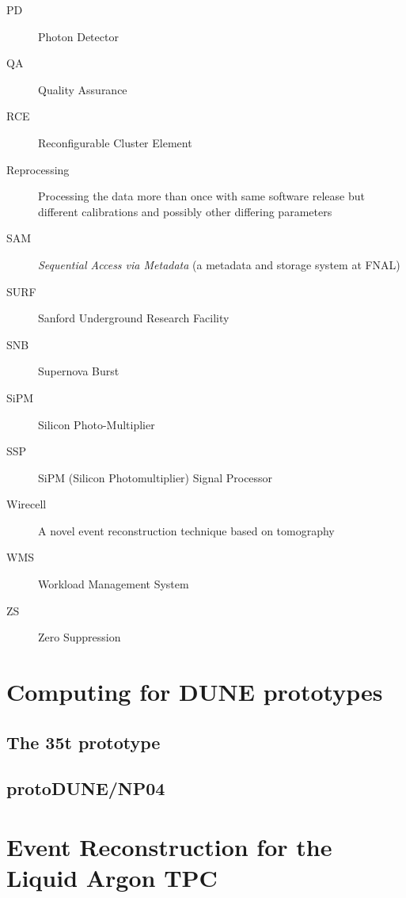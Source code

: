 \begin{description}
\item[PD] Photon Detector
\item[QA] Quality Assurance
\item[RCE] Reconfigurable Cluster Element
\item[Reprocessing] Processing the data more than once with same software release but different calibrations and possibly other differing parameters
\item[SAM] \textit{Sequential Access via Metadata} (a metadata and storage system at FNAL)
\item[SURF] Sanford Underground Research Facility
\item[SNB] Supernova Burst
\item[SiPM] Silicon Photo-Multiplier
\item[SSP] SiPM (Silicon Photomultiplier) Signal Processor
\item[Wirecell] A novel event reconstruction technique based on tomography
\item[WMS] Workload Management System
\item[ZS] Zero Suppression
\end{description}

\newpage


\newpage
\section{Computing for DUNE prototypes}
\label{sec:dune-prototypes}
\subsection{The 35t prototype}

\newpage
\subsection{protoDUNE/NP04}


\newpage
\section{Event Reconstruction for the Liquid Argon TPC}
\label{sec:reconstruction}
